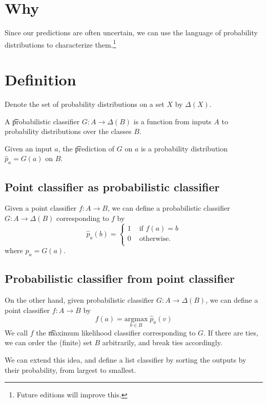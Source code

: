 
\section*{Why}

Since our predictions are often uncertain, we can use the language of probability distributions to characterize them.\footnote{Future editions will improve this.}

\section*{Definition}

Denote the set of probability distributions on a set $X$ by $\Delta(X)$.

A \t{probabilistic classifier} $G: A \to \Delta(B)$ is a function from inputs $A$ to probability distributions over the classes $B$.

Given an input $a$, the \t{prediction} of $G$ on $a$ is a probability distribution $\hat{p}_a = G(a)$ on $B$.

\subsection*{Point classifier as probabilistic classifier}

Given a point classifier $f: A \to B$, we can define a probabilistic classifier $G: A \to \Delta(B)$ corresponding to $f$ by
\[
\hat{p}_a(b) =
\begin{cases}
1 & \text{ if } f(a) = b \\
0 & \text{ otherwise.} \\
\end{cases}
\]
where $\hat{p}_a = G(a).$

\subsection*{Probabilistic classifier from point classifier}

On the other hand, given probabilistic classifier $G: A \to \Delta(B)$, we can define a point classifier $f: A \to B$ by
\[
f(a) = \underset{b \in B}{\text{argmax}} \; \hat{p}_a(v)
\]
We call $f$ the \t{maximum likelihood classifier} corresponding to $G$.
If there are ties, we can order the (finite) set $B$ arbitrarily, and break ties accordingly.

We can extend this idea, and define a list classifier by sorting the outputs by their probability, from largest to smallest.

\blankpage
